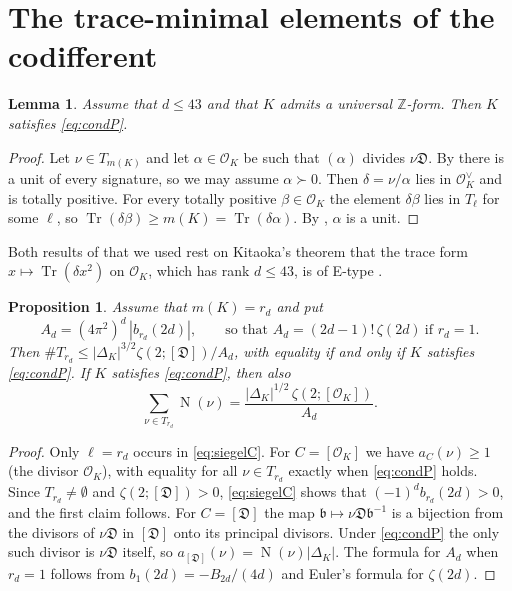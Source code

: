 \documentclass[11pt]{amsart}
\newtheorem{lemma}[theorem]{Lemma}
\newtheorem{proposition}[theorem]{Proposition}
\theoremstyle{definition}
\numberwithin{equation}{section}
\DeclareMathOperator{\Tr}{Tr}
\DeclareMathOperator{\N}{N}
\newcommand{\OK}{\mathcal{O}_K}
\newcommand{\OKd}{\mathcal{O}_K^{\vee}}
\newcommand{\Dif}{\mathfrak{D}}
\newcommand{\Z}{\mathbb{Z}}
\begin{document}
\section{The trace-minimal elements of the codifferent}\label{sec:etype}

\begin{lemma}\label{lem:etype}
Assume that $d\le43$ and that $K$ admits a universal $\Z$-form.  Then $K$ satisfies
\eqref{eq:condP}.
\end{lemma}

\begin{proof}
Let $\nu\in T_{m(K)}$ and let $\alpha\in\OK$ be such that $(\alpha)$ divides $\nu\Dif$.  By
\cite[Corollary~4.5]{KY1} there is a unit of every signature, so we may assume $\alpha\succ0$.  Then
$\delta=\nu/\alpha$ lies in $\OKd$ and is totally positive.  For every totally positive
$\beta\in\OK$ the element $\delta\beta$ lies in $T_\ell$ for some $\ell$, so
$\Tr(\delta\beta)\ge m(K)=\Tr(\delta\alpha)$.  By \cite[Lemma~4.6]{KY1}, $\alpha$ is a unit.
\end{proof}

Both results of \cite{KY1} that we used rest on Kitaoka's theorem that the trace form
$x\mapsto\Tr(\delta x^2)$ on $\OK$, which has rank $d\le43$, is of E-type \cite[Theorem~4.2]{KY1}.

\begin{proposition}\label{prop:identity}
Assume that $m(K)=r_d$ and put
\begin{equation}\label{eq:Ad}
  A_d=(4\pi^2)^d\,|b_{r_d}(2d)| ,\qquad\text{so that } A_d=(2d-1)!\,\zeta(2d)\ \text{if } r_d=1 .
\end{equation}
Then $\#T_{r_d}\le|\Delta_K|^{3/2}\zeta(2;[\Dif])/A_d$, with equality if and only if $K$ satisfies
\eqref{eq:condP}.  If $K$ satisfies \eqref{eq:condP}, then also
\[
  \sum_{\nu\in T_{r_d}}\N(\nu)=\frac{|\Delta_K|^{1/2}\,\zeta(2;[\OK])}{A_d}.
\]
\end{proposition}

\begin{proof}
Only $\ell=r_d$ occurs in \eqref{eq:siegelC}.  For $C=[\OK]$ we have $a_C(\nu)\ge1$ (the divisor
$\OK$), with equality for all $\nu\in T_{r_d}$ exactly when \eqref{eq:condP} holds.  Since
$T_{r_d}\ne\emptyset$ and $\zeta(2;[\Dif])>0$, \eqref{eq:siegelC} shows that $(-1)^db_{r_d}(2d)>0$,
and the first claim follows.  For $C=[\Dif]$ the map
$\mathfrak b\mapsto\nu\Dif\mathfrak b^{-1}$ is a bijection from the divisors of $\nu\Dif$ in $[\Dif]$
onto its principal divisors.  Under \eqref{eq:condP} the only such divisor is $\nu\Dif$ itself, so
$a_{[\Dif]}(\nu)=\N(\nu)|\Delta_K|$.  The formula for $A_d$ when $r_d=1$ follows from
$b_1(2d)=-B_{2d}/(4d)$ and Euler's formula for $\zeta(2d)$.
\end{proof}
\end{document}
